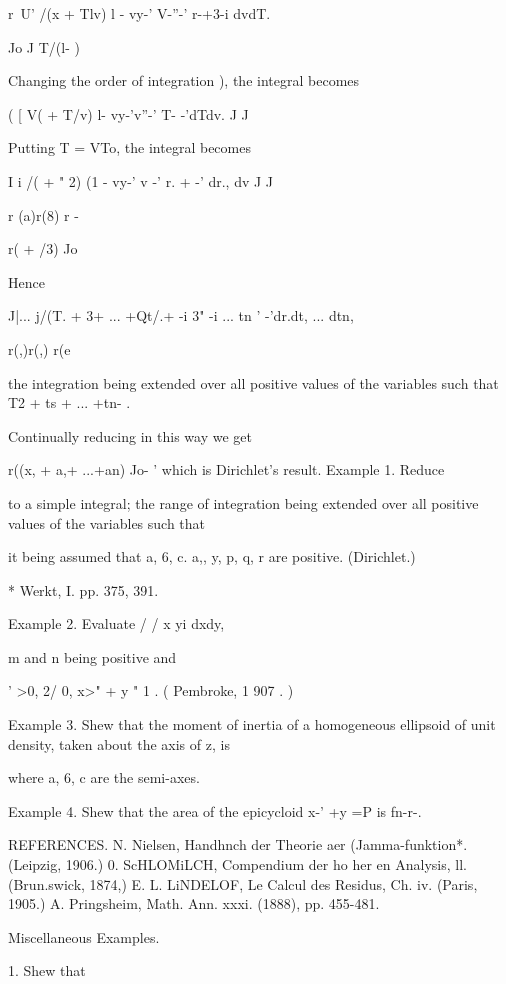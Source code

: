 r~U' /(x + Tlv) l - vy-' V-''-' r-+3-i dvdT.

Jo J T/(l- )

Changing the order of integration ), the integral becomes

( [ V( + T/v) l- vy-'v''-' T- -'dTdv. J J

Putting T = VTo, the integral becomes

I i /( + " 2) (1 - vy-' v -' r. + -' dr., dv J J

r (a)r(8) r -

r( + /3) Jo

Hence

  J|... j/(T. + 3+ ... +Qt/.+ -i 3" -i ... tn ' -'dr.dt, ... dtn,

r(,)r(,) r(e

the integration being extended over all positive values of the
variables such that T2 + ts + ... +tn- .

Continually reducing in this way we get

r((x, + a,+ ...+an) Jo- ' which is Dirichlet's result. Example 1.
Reduce

to a simple integral; the range of integration being extended over
all positive values of the variables such that

it being assumed that a, 6, c. a,, y, p, q, r are positive.
(Dirichlet.)

* Werkt, I. pp. 375, 391.

%
%

Example 2. Evaluate / / x yi dxdy,

m and n being positive and

' >0, 2/ 0, x>" + y " 1 . ( Pembroke, 1 907 . )

Example 3. Shew that the moment of inertia of a homogeneous ellipsoid
of unit density, taken about the axis of z, is

where a, 6, c are the semi-axes.

Example 4. Shew that the area of the epicycloid x-' +y =P is fn-r-.

REFERENCES. N. Nielsen, Handhnch der Theorie aer (Jamma-funktion*.
(Leipzig, 1906.) 0. ScHLOMiLCH, Compendium der ho her en Analysis, ll.
(Brun.swick, 1874,) E. L. LiNDELOF, Le Calcul des Residus, Ch. iv.
(Paris, 1905.) A. Pringsheim, Math. Ann. xxxi. (1888), pp. 455-481.

Miscellaneous Examples.

1. Shew that


